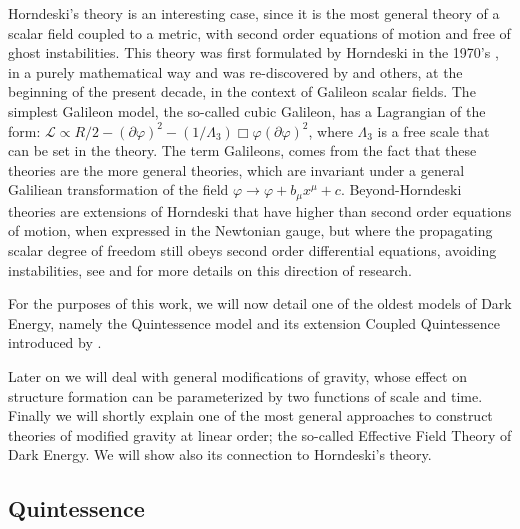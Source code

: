 Horndeski's theory \cite{horndeski_original} is an interesting case, since it is the most general theory of 
a scalar field coupled to a metric, with second order equations of motion and free of ghost instabilities. 
This theory was first formulated by Horndeski in the 1970's \cite{horndeski_original}, in a purely mathematical way and was re-discovered by \cite{deffayet2013formal}
and others, at the beginning of the present decade, in the context of Galileon scalar fields. The simplest Galileon model, the so-called cubic Galileon, has a Lagrangian of the form:
$\mathcal{L} \propto R/2 - (\partial \varphi)^2 - (1/\Lambda_3)\Box \varphi (\partial \varphi)^2$, 
where $ \Lambda_3 $ is a free scale that can be set in the theory. The term Galileons, comes from the fact that
these theories are the more general theories, which are invariant under a general Galiliean transformation of the field $\varphi \rightarrow \varphi + b_\mu x^\mu +c$.
Beyond-Horndeski theories are extensions of Horndeski that have higher than second order equations of motion, when expressed 
in the Newtonian gauge, but where the propagating scalar degree of freedom still obeys second order differential equations, avoiding
instabilities, see
\cite{gleyzes2015exploring} and \cite{zumalacarregui2014transforming} for more details on this direction of research.

For the purposes of this work, we will now detail one of the oldest models of Dark Energy, namely
the Quintessence model \cite{ratra_cosmological_1988, wetterich_cosmology_1988} and its extension
Coupled Quintessence introduced by \cite{Amendola_2000}.

Later on we will deal with general modifications of gravity, whose
effect on structure formation can be parameterized by two functions of
scale and time. Finally we will shortly explain one of the most general approaches
to construct theories of modified gravity at linear order; the so-called Effective Field Theory of Dark Energy. We will show also its connection to Horndeski's theory.

\subsection{Quintessence \label{sub:quintessence}}


